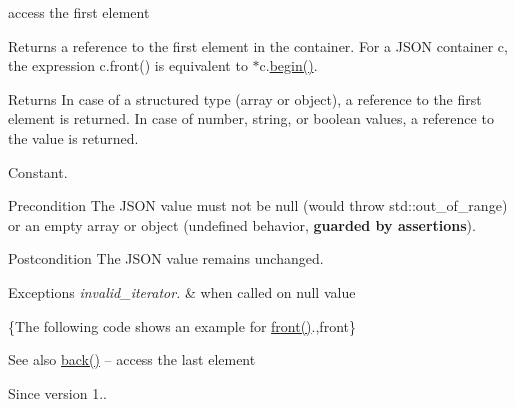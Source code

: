 access the first element 

Returns a reference to the first element in the container. For a J\+S\+ON container {\ttfamily c}, the expression {\ttfamily c.\+front()} is equivalent to {\ttfamily $\ast$c.\mbox{\hyperlink{classnlohmann_1_1basic__json_a0ff28dac23f2bdecee9564d07f51dcdc}{begin()}}}.

\begin{DoxyReturn}{Returns}
In case of a structured type (array or object), a reference to the first element is returned. In case of number, string, or boolean values, a reference to the value is returned.
\end{DoxyReturn}
Constant.

\begin{DoxyPrecond}{Precondition}
The J\+S\+ON value must not be {\ttfamily null} (would throw {\ttfamily std\+::out\+\_\+of\+\_\+range}) or an empty array or object (undefined behavior, {\bfseries guarded by assertions}). 
\end{DoxyPrecond}
\begin{DoxyPostcond}{Postcondition}
The J\+S\+ON value remains unchanged.
\end{DoxyPostcond}

\begin{DoxyExceptions}{Exceptions}
{\em invalid\+\_\+iterator.} & when called on {\ttfamily null} value\\
\hline
\end{DoxyExceptions}
\{The following code shows an example for {\ttfamily \mbox{\hyperlink{classnlohmann_1_1basic__json_a3acba9c6ceb7214e565fe08c3ba5b352}{front()}}}.,front\}

\begin{DoxySeeAlso}{See also}
\mbox{\hyperlink{classnlohmann_1_1basic__json_a011397134847f36db0ed7d7a93753677}{back()}} -- access the last element
\end{DoxySeeAlso}
\begin{DoxySince}{Since}
version 1.. 
\end{DoxySince}
\mbox{\label{classnlohmann_1_1basic__json_a4b1fb3671ade9afc8d33b2c9510acbfc}} 
